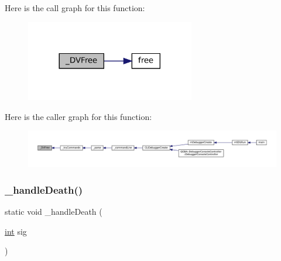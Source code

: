 Here is the call graph for this function\+:
\nopagebreak
\begin{figure}[H]
\begin{center}
\leavevmode
\includegraphics[width=209pt]{debugger_2cli-debugger_8c_aba2bca6a3f7315fff75dd95a9f866970_cgraph}
\end{center}
\end{figure}
Here is the caller graph for this function\+:
\nopagebreak
\begin{figure}[H]
\begin{center}
\leavevmode
\includegraphics[width=350pt]{debugger_2cli-debugger_8c_aba2bca6a3f7315fff75dd95a9f866970_icgraph}
\end{center}
\end{figure}
\mbox{\label{debugger_2cli-debugger_8c_a829639f778965123a1bd18bf71a3ffb0}} 
\subsubsection{\texorpdfstring{\+\_\+handle\+Death()}{\_handleDeath()}}
{\footnotesize\ttfamily static void \+\_\+handle\+Death (\begin{DoxyParamCaption}\item[{\mbox{\hyperlink{ioapi_8h_a787fa3cf048117ba7123753c1e74fcd6}{int}}}]{sig }\end{DoxyParamCaption})\hspace{0.3cm}{\ttfamily [static]}}

